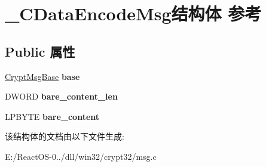 \hypertarget{struct___c_data_encode_msg}{}\section{\+\_\+\+C\+Data\+Encode\+Msg结构体 参考}
\label{struct___c_data_encode_msg}
\subsection*{Public 属性}
\begin{DoxyCompactItemize}
\item 
\mbox{\label{struct___c_data_encode_msg_a53a40b97700758aa3dd2e53ee841c4af}} 
\hyperlink{struct___crypt_msg_base}{Crypt\+Msg\+Base} {\bfseries base}
\item 
\mbox{\label{struct___c_data_encode_msg_a3f570f352d95eafb50726a2e6fe8c2ac}} 
D\+W\+O\+RD {\bfseries bare\+\_\+content\+\_\+len}
\item 
\mbox{\label{struct___c_data_encode_msg_a8747340ee874b14d233b190debed00e3}} 
L\+P\+B\+Y\+TE {\bfseries bare\+\_\+content}
\end{DoxyCompactItemize}


该结构体的文档由以下文件生成\+:\begin{DoxyCompactItemize}
\item 
E\+:/\+React\+O\+S-\/0../dll/win32/crypt32/msg.\+c\end{DoxyCompactItemize}
